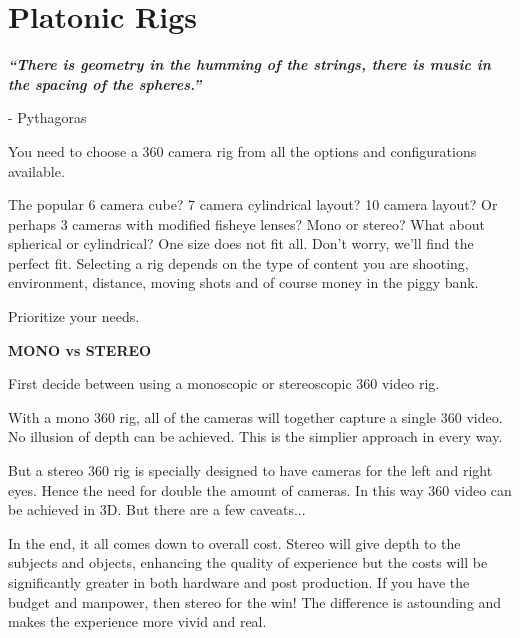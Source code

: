 \section{Platonic Rigs}
\pagecolor{white}
\label{chap:2}
\begin{fullwidth}

{\itshape\bfseries “There is geometry in the humming of the strings, there is music in the spacing of the spheres.”}

- Pythagoras
\vspace{\baselineskip}

\problem

{\large You need to choose a 360 camera rig from all the options and configurations available. \par}

The popular 6 camera cube? 7 camera cylindrical layout? 10 camera layout? Or perhaps 3 cameras with modified fisheye lenses? Mono or stereo? What about spherical or cylindrical? One size does not fit all. Don’t worry, we’ll find the perfect fit. Selecting a rig depends on the type of content you are shooting, environment, distance, moving shots and of course money in the piggy bank.

\solution

{\large Prioritize your needs. \par}

{\bfseries MONO vs STEREO}

\clearpage
First decide between using a monoscopic or stereoscopic 360 video rig. 

With a mono 360 rig, all of the cameras will together capture a single 360 video. No illusion of depth can be achieved. This is the simplier approach in every way.

But a stereo 360 rig is specially designed to have cameras for the left and right eyes. Hence the need for double the amount of cameras. In this way 360 video can be achieved in 3D. But there are a few caveats...

In the end, it all comes down to overall cost. Stereo will give depth to the subjects and objects, enhancing the quality of experience but the costs will be significantly greater in both hardware and post production. If you have the budget and manpower, then stereo for the win! The difference is astounding and makes the experience more vivid and real. 


\end{fullwidth}
